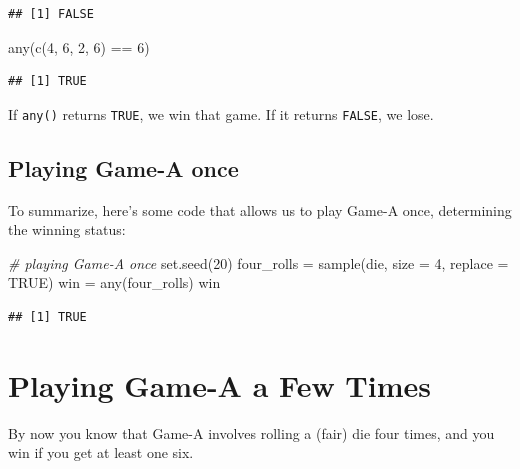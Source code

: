 \documentclass[
]{book}
\newenvironment{Shaded}{\begin{snugshade}}{\end{snugshade}}
\newcommand{\AttributeTok}[1]{\textcolor[rgb]{0.77,0.63,0.00}{#1}}
\newcommand{\CommentTok}[1]{\textcolor[rgb]{0.56,0.35,0.01}{\textit{#1}}}
\newcommand{\ConstantTok}[1]{\textcolor[rgb]{0.00,0.00,0.00}{#1}}
\newcommand{\DecValTok}[1]{\textcolor[rgb]{0.00,0.00,0.81}{#1}}
\newcommand{\FunctionTok}[1]{\textcolor[rgb]{0.00,0.00,0.00}{#1}}
\newcommand{\NormalTok}[1]{#1}
\newcommand{\OtherTok}[1]{\textcolor[rgb]{0.56,0.35,0.01}{#1}}
\newcommand{\SpecialCharTok}[1]{\textcolor[rgb]{0.00,0.00,0.00}{#1}}
\begin{document}
\begin{verbatim}
## [1] FALSE
\end{verbatim}

\begin{Shaded}
\begin{Highlighting}[]
\FunctionTok{any}\NormalTok{(}\FunctionTok{c}\NormalTok{(}\DecValTok{4}\NormalTok{, }\DecValTok{6}\NormalTok{, }\DecValTok{2}\NormalTok{, }\DecValTok{6}\NormalTok{) }\SpecialCharTok{==} \DecValTok{6}\NormalTok{)}
\end{Highlighting}
\end{Shaded}

\begin{verbatim}
## [1] TRUE
\end{verbatim}

If \texttt{any()} returns \texttt{TRUE}, we win that game. If it returns \texttt{FALSE}, we lose.

\hypertarget{playing-game-a-once}{%
\section{Playing Game-A once}\label{playing-game-a-once}}

To summarize, here's some code that allows us to play Game-A once,
determining the winning status:

\begin{Shaded}
\begin{Highlighting}[]
\CommentTok{\# playing Game{-}A once}
\FunctionTok{set.seed}\NormalTok{(}\DecValTok{20}\NormalTok{)}
\NormalTok{four\_rolls }\OtherTok{=} \FunctionTok{sample}\NormalTok{(die, }\AttributeTok{size =} \DecValTok{4}\NormalTok{, }\AttributeTok{replace =} \ConstantTok{TRUE}\NormalTok{)}
\NormalTok{win }\OtherTok{=} \FunctionTok{any}\NormalTok{(four\_rolls)}
\NormalTok{win}
\end{Highlighting}
\end{Shaded}

\begin{verbatim}
## [1] TRUE
\end{verbatim}

\hypertarget{playing-game-a-a-few-times}{%
\chapter{Playing Game-A a Few Times}\label{playing-game-a-a-few-times}}

By now you know that Game-A involves rolling a (fair) die four times, and
you win if you get at least one six.
\end{document}
